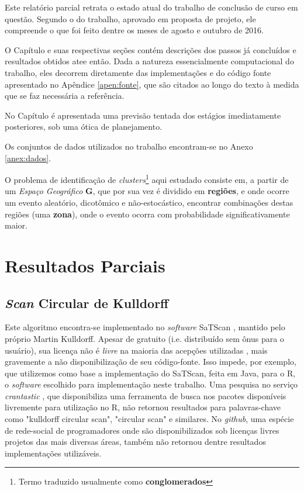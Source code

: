 \documentclass[
	12pt,				%
	openright,			%
	twoside,			%
	a4paper,			%
	english,			%
	french,				%
	spanish,			%
	brazil,				%
	]{abntex2}
\begin{document}
Este relatório parcial retrata o estado atual do trabalho de conclusão de curso em questão. Segundo o  do trabalho, aprovado em proposta de projeto, ele compreende o que foi feito dentre os meses de agosto e outubro de 2016.

O Capítulo  e suas respectivas seções contém descrições dos passos já concluídos e resultados obtidos atee então. Dada a natureza essencialmente computacional do trabalho, eles decorrem diretamente das implementações e do código fonte apresentado no Apêndice \ref{apen:fonte}, que são citados ao longo do texto à medida que se faz necessária a referência.

No Capítulo  é apresentada uma previsão tentada dos estágios imediatamente posteriores, sob uma ótica de planejamento. 

Os conjuntos de dados utilizados no trabalho encontram-se no Anexo \ref{anex:dados}.

O problema de identificação de \textit{clusters}\footnote{Termo traduzido usualmente como \textbf{conglomerados}} aqui estudado consiste em, a partir de um \textit{Espaço Geográfico} \textbf{G}, que por sua vez é dividido em \textbf{regiões}, e onde ocorre um evento aleatório, dicotômico e não-estocástico, encontrar combinações destas regiões (uma \textbf{zona}), onde o evento ocorra com probabilidade significativamente maior.


\chapter{Resultados Parciais}
\label{chap:parciais}
\section{\textit{Scan} Circular de Kulldorff}

Este algoritmo encontra-se implementado no \textit{software} SaTScan \cite{_satscan_????}, mantido pelo próprio Martin Kulldorff. Apesar de gratuito (i.e. distribuído sem ônus para o usuário), sua licença não é \textit{livre} na maioria das acepções utilizadas \cite{_free_????}, mais gravemente a não disponibilização de seu código-fonte. Isso impede, por exemplo, que utilizemos como base a implementação do SaTScan, feita em Java, para o R, o \textit{software} escolhido para implementação neste trabalho. Uma pesquisa no serviço \textit{crantastic} \cite{_its_????}, que disponibiliza uma ferramenta de busca nos pacotes disponíveis livremente para utilização no R, não retornou resultados para palavras-chave como "kulldorff circular scan", "circular scan" e similares. No \textit{github}, uma espécie de rede-social de programadores onde são disponibilizados sob licenças livres projetos das mais diversas áreas, também não retornou dentre resultados implementações utilizáveis.
\end{document}
